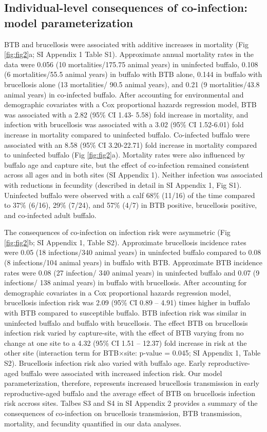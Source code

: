\documentclass[10pt,letterpaper]{article}
\begin{document}
\subsection*{Individual-level consequences of co-infection: model parameterization} 

BTB and brucellosis were associated with additive increases in mortality (Fig \ref{fig:fig2}a; SI Appendix 1 Table S1). Approximate annual mortality rates in the data were 0.056 (10 mortalities/175.75 animal years) in uninfected buffalo, 0.108 (6 mortalities/55.5 animal years) in buffalo with BTB alone, 0.144 in buffalo with brucellosis alone (13 mortalities/ 90.5 animal years), and 0.21 (9 mortalities/43.8 animal years) in co-infected buffalo. After accounting for environmental and demographic covariates with a Cox proportional hazards regression model, BTB was associated with a 2.82 (95\% CI 1.43- 5.58) fold increase in mortality, and infection with brucellosis was associated with a 3.02 (95\% CI 1.52-6.01) fold increase in mortality compared to uninfected buffalo. Co-infected buffalo were associated with an 8.58 (95\% CI 3.20-22.71) fold increase in mortality compared to uninfected buffalo (Fig \ref{fig:fig2}a). Mortality rates were also influenced by buffalo age and capture site, but the effect of co-infection remained consistent across all ages and in both sites (SI Appendix 1). Neither infection was associated with reductions in fecundity (described in detail in SI Appendix 1, Fig S1). Uninfected buffalo were observed with a calf 68\% (11/16) of the time compared to 37\% (6/16), 29\% (7/24), and 57\% (4/7) in BTB positive, brucellosis positive, and co-infected adult buffalo.

The consequences of co-infection on infection risk were asymmetric (Fig \ref{fig:fig2}b; SI Appendix 1, Table S2). Approximate brucellosis incidence rates were 0.05 (18 infections/340 animal years) in uninfected buffalo compared to 0.08 (8 infections/104 animal years) in buffalo with BTB. Approximate BTB incidence rates were 0.08 (27 infection/ 340 animal years) in uninfected buffalo and 0.07 (9 infections/ 138 animal years) in buffalo with brucellosis. After accounting for demographic covariates in a Cox proportional hazards regression model, brucellosis infection risk was 2.09 (95\% CI 0.89 – 4.91) times higher in buffalo with BTB compared to susceptible buffalo. BTB infection risk was similar in uninfected buffalo and buffalo with brucellosis. The effect BTB on brucellosis infection risk varied by capture-site, with the effect of BTB varying from no change at one site to a 4.32 (95\% CI 1.51 – 12.37) fold increase in risk at the other site (interaction term for BTB$\times$site: p-value = 0.045; SI Appendix 1, Table S2). Brucellosis infection risk also varied with buffalo age. Early reproductive-aged buffalo were associated with increased infection risk. Our model parameterization, therefore, represents increased brucellosis transmission in early reproductive-aged buffalo and the average effect of BTB on brucellosis infection risk accross sites. Talbes S3 and S4 in SI Appendix 2 provides a summary of the consequences of co-infection on brucellosis transmission, BTB transmission, mortality, and fecundity quantified in our data analyses.
\end{document}

